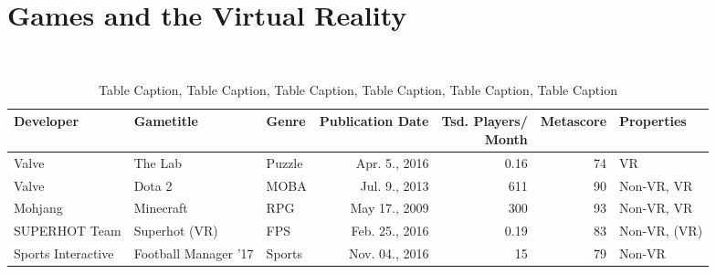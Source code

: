 \section{Games and the Virtual Reality}

\begin{table}[h]\footnotesize
	\caption{Table Caption, Table Caption, Table Caption, Table Caption, Table Caption, Table Caption}~\label{tab:table1}
	\begin{tabular*}{1\columnwidth}{ l l l r r r l }
		Developer & Gametitle & Genre\footnotemark[1] & Publication Date & \parbox[t]{2cm}{Tsd. Players/\\Month\footnotemark[2]} & Metascore\footnotemark[3] & Properties\\
		\hline
		Valve & The Lab & Puzzle & Apr. 5., 2016 & 0.16 & 74 & VR \\
		Valve & Dota 2 & MOBA & Jul. 9., 2013 & 611 & 90 & Non-VR, VR \\
		Mohjang & Minecraft & RPG & May 17., 2009 & 300 & 93 & Non-VR, VR \\
		SUPERHOT Team & Superhot (VR) & FPS & Feb. 25., 2016 & 0.19 & 83 & Non-VR, (VR) \\
		Sports Interactive & Football Manager '17 & Sports & Nov. 04., 2016 & 15 & 79 & Non-VR \\
	\end{tabular*}
	
\end{table}
